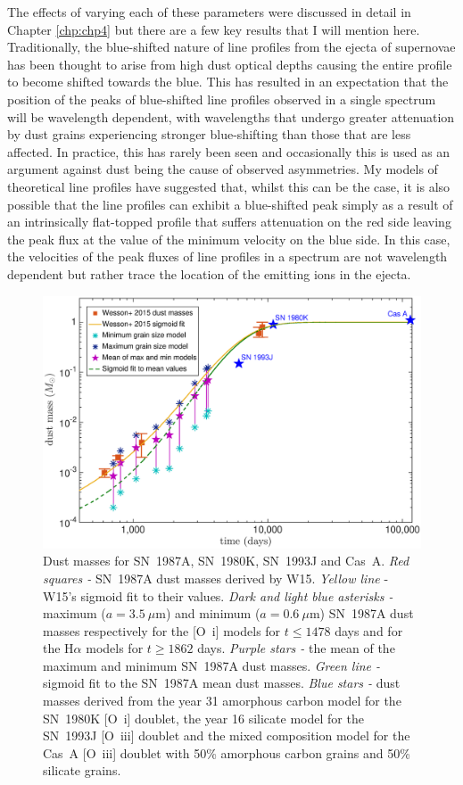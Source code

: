 The effects of varying each of these parameters were discussed in detail in Chapter \ref{chp:chp4} but there are a few key results that I will mention here.  Traditionally, the blue-shifted nature of line profiles from the ejecta of supernovae has been thought to arise from high dust optical depths causing the entire profile to become shifted towards the blue.  This has resulted in an expectation that the position of the peaks of blue-shifted line profiles observed in a single spectrum will be wavelength dependent, with wavelengths that undergo greater attenuation by dust grains experiencing stronger blue-shifting than those that are less affected.  In practice, this has rarely been seen and occasionally this is used as an argument against dust being the cause of observed asymmetries.  My models of theoretical line profiles have suggested that, whilst this can be the case, it is also possible that the line profiles can exhibit a blue-shifted peak simply as a result of an intrinsically flat-topped profile that suffers attenuation on the red side leaving the peak flux at the value of the minimum velocity on the blue side.  In this case, the velocities of the peak fluxes of line profiles in a spectrum are not wavelength dependent but rather trace the location of the emitting ions in the ejecta.

\begin{figure}
\centering
\includegraphics[scale=0.45,clip=true, trim=45 15 80 30]{chapters/chapter7/figs/Mdust_evol9.eps}
\caption{Dust masses for SN~1987A, SN~1980K, SN~1993J and Cas~A. \textit{Red squares -} SN~1987A dust masses derived by W15. \textit{Yellow line} - 
W15's sigmoid fit to 
their values. \textit{Dark and light blue asterisks -} maximum 
($a=3.5~\mu$m) and 
minimum ($a=0.6~\mu$m) SN~1987A dust masses respectively for the [O~{\sc i}] models 
for $t \le 1478$ days and for the H$\alpha$ models for $t \ge 1862$ days. 
\textit{Purple 
stars -}  the mean of the maximum and 
minimum SN~1987A dust masses.
\textit{Green line -} sigmoid fit 
to the SN~1987A mean dust masses.  \textit{Blue stars -} dust masses derived from the year 31 amorphous carbon model for the SN~1980K [O~{\sc i}] doublet, the year 16 silicate model for the SN~1993J  [O~{\sc iii}] doublet and the mixed composition model for the Cas~A [O~{\sc iii}] doublet with 50\% amorphous carbon grains and 50\% silicate grains.}
\label{dust1}
\end{figure}

